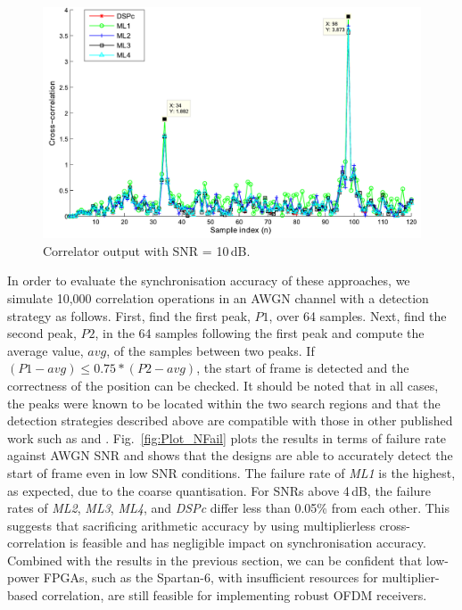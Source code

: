 \begin{figure}
	\centerline{\includegraphics [width=0.9\columnwidth] {figures/Plot_XCR.pdf} }
	\caption{Correlator output with SNR = 10\,dB.}
	\label{fig:Plot_XCR}
\end{figure}

In order to evaluate the synchronisation accuracy of these approaches, we simulate 10,000 correlation operations in an AWGN channel with a detection strategy as follows.
First, find the first peak, $P1$, over 64 samples.
Next, find the second peak, $P2$, in the 64 samples following the first peak and compute the average value, $avg$, of the samples between two peaks.
If  $( P1 - avg ) \le  0.75 * ( P2 - avg )$, the start of frame is detected and the correctness of the position can be checked.
It should be noted that in all cases, the peaks were known to be located within the two search regions and that the detection strategies described above are compatible with those in other published work such as \cite{Kishore2006} and \cite{Yip2003}.
Fig.~\ref{fig:Plot_NFail} plots the results in terms of failure rate against AWGN SNR and shows that the designs are able to accurately detect the start of frame even in low SNR conditions.
The failure rate of \emph{ML1} is the highest, as expected, due to the coarse quantisation.
For SNRs above 4\,dB, the failure rates of \emph{ML2}, \emph{ML3}, \emph{ML4}, and \emph{DSPc} differ less than 0.05\% from each other.
This suggests that sacrificing arithmetic accuracy by using multiplierless cross-correlation is feasible and has negligible impact on synchronisation accuracy.
Combined with the results in the previous section, we can be confident that low-power FPGAs, such as the Spartan-6, with insufficient resources for multiplier-based correlation, are still feasible for implementing robust OFDM receivers.

